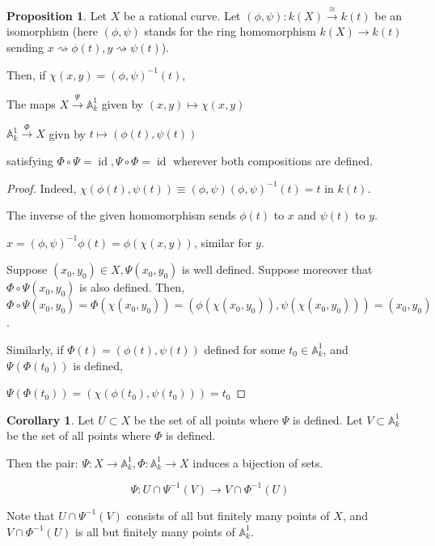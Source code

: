 \documentclass{article}
\theoremstyle{definition}
\newtheorem{proposition}[theorem]{Proposition}
\newtheorem{corollary}[theorem]{Corollary}
\begin{document}
        \begin{proposition}
            Let \(X\) be a rational curve. Let \((\phi, \psi): k(X) \xrightarrow{\cong} k(t)\) be an isomorphism (here \((\phi ,\psi )\) stands for the ring homomorphism \(k(X) \to k(t)\) sending \(x \rightsquigarrow \phi(t), y \rightsquigarrow \psi(t)\)).

            Then, if \(\chi(x,y) = (\phi,\psi)^{-1} (t)\),

            The maps \(X \xrightarrow{\Psi} \mathbb{A}_k^1\) given by \((x,y) \mapsto \chi(x,y)\) 

            \(\mathbb{A}_k^1 \xrightarrow{\Phi} X\) givn by \(t \mapsto (\phi(t),\psi(t))\) 

            satisfying \(\Phi \circ \Psi = \operatorname{id}, \Psi \circ \Phi = \operatorname{id}\) wherever both compositions are defined.
        \end{proposition}

        \begin{proof}
            Indeed, \(\chi(\phi(t),\psi(t)) \equiv  (\phi, \psi)(\phi,\psi)^{-1}(t) = t\) in \(k(t)\).
            
            The inverse of the given homomorphism sends \(\phi(t)\) to \(x\) and \(\psi(t)\) to \(y\). 

            \(x = (\phi, \psi) ^{-1} \phi(t) = \phi(\chi(x,y))\), similar for \(y\).
            
            Suppose \((x_0,y_0)\in X, \Psi(x_0, y_0)\) is well defined. Suppose moreover that \(\Phi \circ \Psi (x_0,y_0)\) is also defined. Then, \(\Phi \circ \Psi(x_0,y_0)=\Phi(\chi(x_0,y_0)) = (\phi(\chi(x_0,y_0)),\psi(\chi(x_0,y_0))) = (x_0,y_0)\).
            
            Similarly, if \(\Phi(t) = (\phi (t), \psi (t))\) defined for some \(t_0 \in \mathbb{A}_k^1\), and \(\Psi(\Phi(t_0))\) is defined,
            
            \(\Psi(\Phi(t_0)) = (\chi(\phi(t_0),\psi(t_0)))=t_0\) 
        \end{proof}

        \begin{corollary}
            Let \(U \subset X\) be the set of all points where \(\Psi\) is defined. Let \(V \subset \mathbb{A}^1_k\) be the set of all points where \(\Phi\) is defined.

            Then the pair: \(\Psi : X \to \mathbb{A}_k^1, \Phi: \mathbb{A}_k^1 \to X\) induces a bijection of sets. 

            \[
                \Psi : U \cap \Psi ^{-1} (V) \to  V \cap \Phi ^{-1} (U)
            \]

            Note that \(U \cap \Psi ^{-1} (V)\) consists of all but finitely many points of \(X\), and \(V \cap \Phi ^{-1} (U)\) is all but finitely many points of \(\mathbb{A}^1_k\).

        \end{corollary}
\end{document}
